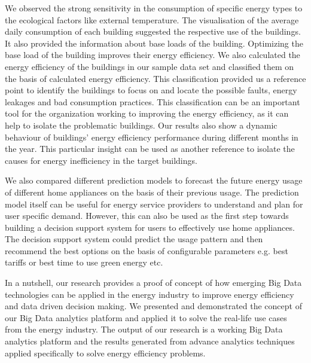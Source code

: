 We observed the strong sensitivity in the consumption of specific energy types to the ecological factors like external temperature. The visualisation of the average daily consumption of each building suggested the respective use of the buildings. It also provided the information about base loads of the building. Optimizing the base load of the building improves their energy efficiency. We also calculated the energy efficiency of the buildings in our sample data set and classified them on the basis of calculated energy efficiency. This classification provided us a reference point to identify the buildings to focus on and locate the possible faults, energy leakages and bad consumption practices. This classification can be an important tool for the organization working to improving the energy efficiency, as it can help to isolate the problematic buildings. Our results also show a dynamic behaviour of buildings' energy efficiency performance during different months in the year. This particular insight can be used as another reference to isolate the causes for energy inefficiency in the target buildings.

We also compared different prediction models to forecast the future energy usage of different home appliances on the basis of their previous usage. The prediction model itself can be useful for energy service providers to understand and plan for user specific demand. However, this can also be used as the first step towards building a decision support system for users to effectively use home appliances. The decision support system could predict the usage pattern and then recommend the best options on the basis of configurable parameters e.g. best tariffs or best time to use green energy etc. 

In a nutshell, our research provides a proof of concept of how emerging Big Data technologies can be applied in the energy industry to improve energy efficiency and data driven decision making. We presented and demonstrated the concept of our Big Data analytics platform and applied it to solve the real-life use cases from the energy industry. The output of our research is a working Big Data analytics platform and the results generated from advance analytics techniques applied specifically to solve energy efficiency problems.  
     

